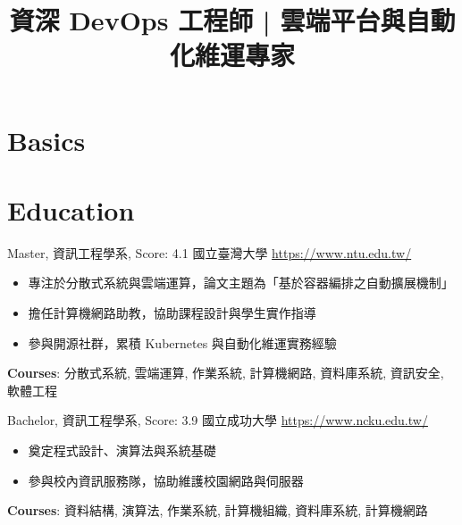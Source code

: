 \documentclass[a4paper, serif, 10pt]{moderncv}
\title{資深 DevOps 工程師 | 雲端平台與自動化維運專家}
\begin{document}
\maketitle

\section{Basics}

\section{Education}

        {Master, 資訊工程學系, Score: 4.1}
        {國立臺灣大學}
        {\url{https://www.ntu.edu.tw/}}
        {}
        {\begin{itemize}
\item 專注於分散式系統與雲端運算，論文主題為「基於容器編排之自動擴展機制」
\item 擔任計算機網路助教，協助課程設計與學生實作指導
\item 參與開源社群，累積 Kubernetes 與自動化維運實務經驗
\end{itemize}
\textbf{Courses}: 分散式系統, 雲端運算, 作業系統, 計算機網路, 資料庫系統, 資訊安全, 軟體工程}

        {Bachelor, 資訊工程學系, Score: 3.9}
        {國立成功大學}
        {\url{https://www.ncku.edu.tw/}}
        {}
        {\begin{itemize}
\item 奠定程式設計、演算法與系統基礎
\item 參與校內資訊服務隊，協助維護校園網路與伺服器
\end{itemize}
\textbf{Courses}: 資料結構, 演算法, 作業系統, 計算機組織, 資料庫系統, 計算機網路}
\end{document}
